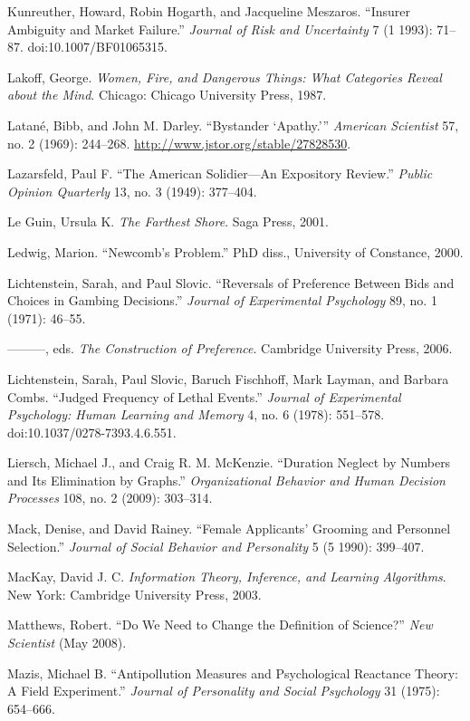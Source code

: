 \documentclass[letterpaper]{book}
\begin{document}
{
 Kunreuther, Howard, Robin Hogarth, and Jacqueline Meszaros.
``Insurer Ambiguity and Market
Failure.'' \textit{Journal of Risk and Uncertainty} 7
(1 1993): 71--87. doi:10.1007/BF01065315.}

{
 Lakoff, George. \textit{Women, Fire, and Dangerous Things: What
Categories Reveal about the Mind}. Chicago: Chicago University Press,
1987.}

{
 Latané, Bibb, and John M. Darley. ``Bystander
`Apathy.'''
\textit{American Scientist} 57, no. 2 (1969): 244--268.
\url{http://www.jstor.org/stable/27828530}.}

{
 Lazarsfeld, Paul F. ``The American Solidier---An
Expository Review.'' \textit{Public Opinion
Quarterly} 13, no. 3 (1949): 377--404.}

{
 Le Guin, Ursula K. \textit{The Farthest Shore}. Saga Press, 2001.}

{
 Ledwig, Marion. ``Newcomb's
Problem.'' PhD diss., University of Constance, 2000.}

{
 Lichtenstein, Sarah, and Paul Slovic. ``Reversals
of Preference Between Bids and Choices in Gambing
Decisions.'' \textit{Journal of Experimental
Psychology} 89, no. 1 (1971): 46--55.}

{
 {}---{}---{}---, eds. \textit{The Construction of Preference}.
Cambridge University Press, 2006.}

{
 Lichtenstein, Sarah, Paul Slovic, Baruch Fischhoff, Mark Layman,
and Barbara Combs. ``Judged Frequency of Lethal
Events.'' \textit{Journal of Experimental Psychology:
Human Learning and Memory} 4, no. 6 (1978): 551--578.
doi:10.1037/0278-7393.4.6.551.}

{
 Liersch, Michael J., and Craig R. M. McKenzie.
``Duration Neglect by Numbers and Its Elimination by
Graphs.'' \textit{Organizational Behavior and Human
Decision Processes} 108, no. 2 (2009): 303--314.}

{
 Mack, Denise, and David Rainey. ``Female
Applicants' Grooming and Personnel
Selection.'' \textit{Journal of Social Behavior and
Personality} 5 (5 1990): 399--407.}

{
 MacKay, David J. C. \textit{Information Theory, Inference, and
Learning Algorithms}. New York: Cambridge University Press, 2003.}

{
 Matthews, Robert. ``Do We Need to Change the
Definition of Science?'' \textit{New Scientist} (May
2008).}

{
 Mazis, Michael B. ``Antipollution Measures and
Psychological Reactance Theory: A Field Experiment.''
\textit{Journal of Personality and Social Psychology} 31 (1975):
654--666.}
\end{document}
